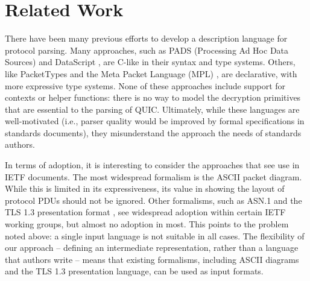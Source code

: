 \documentclass[10pt,sigconf]{acmart}
\begin{document}
\section{Related Work}
\label{sec:related}

%
% 

There have been many previous efforts to develop a description language for protocol
parsing. Many approaches, such as PADS (Processing Ad Hoc Data Sources)
\cite{fisher2005pads} and DataScript \cite{back2002datascript}, are C-like in their
syntax and type systems. Others, like PacketTypes \cite{mccann2000packet} and the Meta
Packet Language (MPL) \cite{madhavapeddy2007melange}, are declarative, with more expressive
type systems. None of these approaches include support for contexts or helper functions:
there is no way to model the decryption primitives that are essential to the parsing of
QUIC. Ultimately, while these languages are well-motivated (i.e., parser quality would
be improved by formal specifications in standards documents), they misunderstand the
approach the needs of standards authors. 

In terms of adoption, it is interesting to consider the approaches that see use in IETF
documents. The most widespread formalism is the ASCII packet diagram. While this is
limited in its expressiveness, its value in showing the layout of protocol PDUs should not
be ignored. Other formalisms, such as ASN.1 \cite{x680} and the TLS 1.3 presentation
format \cite{draft-ietf-tls-tls13-28}, see widespread adoption within certain IETF
working groups, but almost no adoption in most. This points to the problem noted above: a
single input language is not suitable in all cases. The flexibility of our approach --
defining an intermediate representation, rather than a language that authors write -- means
that existing formalisms, including ASCII diagrams and the TLS 1.3 presentation language,
can be used as input formats. 
\end{document}
